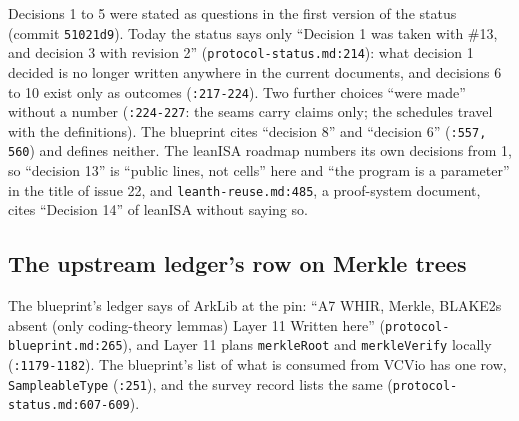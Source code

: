 \begin{sloppypar}
Decisions 1 to 5 were stated as questions in the first version of the status (commit \texttt{51021d9}). Today the status says only ``Decision 1 was taken with \#13, and decision 3 with revision 2'' (\texttt{protocol-\allowbreak{}status.\allowbreak{}md:\allowbreak{}214}): what decision 1 decided is no longer written anywhere in the current documents, and decisions 6 to 10 exist only as outcomes (\texttt{:\allowbreak{}217-\allowbreak{}224}). Two further choices ``were made'' without a number (\texttt{:\allowbreak{}224-\allowbreak{}227}: the seams carry claims only; the schedules travel with the definitions). The blueprint cites ``decision 8'' and ``decision 6'' (\texttt{:\allowbreak{}557,\allowbreak{} 560}) and defines neither. The leanISA roadmap numbers its own decisions from 1, so ``decision 13'' is ``public lines, not cells'' here and ``the program is a parameter'' in the title of issue 22, and \texttt{leanth-\allowbreak{}reuse.\allowbreak{}md:\allowbreak{}485}, a proof-system document, cites ``Decision 14'' of leanISA without saying so.
\end{sloppypar}

\subsection{The upstream ledger's row on Merkle trees}\label{sec:docs-merkle}

\begin{sloppypar}
The blueprint's ledger says of ArkLib at the pin: ``A7 WHIR, Merkle, BLAKE2s \textbar{} absent (only coding-theory lemmas) \textbar{} Layer 11 \textbar{} Written here'' (\texttt{protocol-\allowbreak{}blueprint.\allowbreak{}md:\allowbreak{}265}), and Layer 11 plans \texttt{merkleRoot} and \texttt{merkleVerify} locally (\texttt{:\allowbreak{}1179-\allowbreak{}1182}). The blueprint's list of what is consumed from VCVio has one row, \texttt{SampleableType} (\texttt{:\allowbreak{}251}), and the survey record lists the same (\texttt{protocol-\allowbreak{}status.\allowbreak{}md:\allowbreak{}607-\allowbreak{}609}).
\end{sloppypar}


